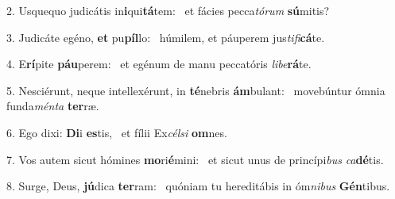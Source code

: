 2. Usquequo judicátis in\textbf{i}qui\textbf{tá}tem: \ast\  et fácies pecca\textit{tó}\textit{rum} \textbf{sú}mitis?\

3. Judicáte egéno, \textbf{et} pu\textbf{píl}lo: \ast\  húmilem, et páuperem jus\textit{ti}\textit{fi}\textbf{cá}te.\

4. E\textbf{rí}pite \textbf{páu}perem: \ast\  et egénum de manu peccatóris \textit{li}\textit{be}\textbf{rá}te.\

5. Nesciérunt, neque intellexérunt, in \textbf{té}nebris \textbf{ám}bulant: \ast\  movebúntur ómnia funda\textit{mén}\textit{ta} \textbf{ter}ræ.\

6. Ego dixi: \textbf{Di}i \textbf{es}tis, \ast\  et fílii Ex\textit{cél}\textit{si} \textbf{om}nes.\

7. Vos autem sicut hómines \textbf{mo}ri\textbf{é}mini: \ast\  et sicut unus de princípi\textit{bus} \textit{ca}\textbf{dé}tis.\

8. Surge, Deus, \textbf{jú}dica \textbf{ter}ram: \ast\  quóniam tu hereditábis in óm\textit{ni}\textit{bus} \textbf{Gén}tibus.\

